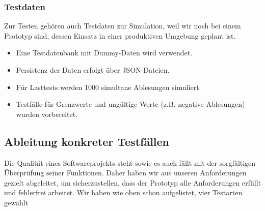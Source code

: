 \subsubsection{Testdaten}

Zur Testen gehören auch Testdaten zur Simulation, weil wir noch bei einem Prototyp sind, dessen Einsatz in einer produktiven Umgebung geplant ist.

\begin{itemize}
	\item Eine Testdatenbank mit Dummy-Daten wird verwendet.
	\item Persistenz der Daten erfolgt über JSON-Dateien.
	\item Für Lasttests werden 1000 simultane Ablesungen simuliert.
    \item Testfälle für Grenzwerte und ungültige Werte (z.B. negative Ablesungen) wurden vorbereitet.
\end{itemize}

\subsection{Ableitung konkreter Testfällen}\label{subsec:ableitung-konkreter-testfallen}

Die Qualität eines Softwareprojekts steht sowie es auch fällt mit der sorgfältigen Überprüfung seiner Funktionen.
Daher haben wir aus unseren Anforderungen gezielt abgeleitet, um sicherzustellen, dass der Prototyp alle Anforderungen erfüllt und fehlerfrei arbeitet.
Wir haben wie oben schon aufgelistet, vier Testarten gewählt

